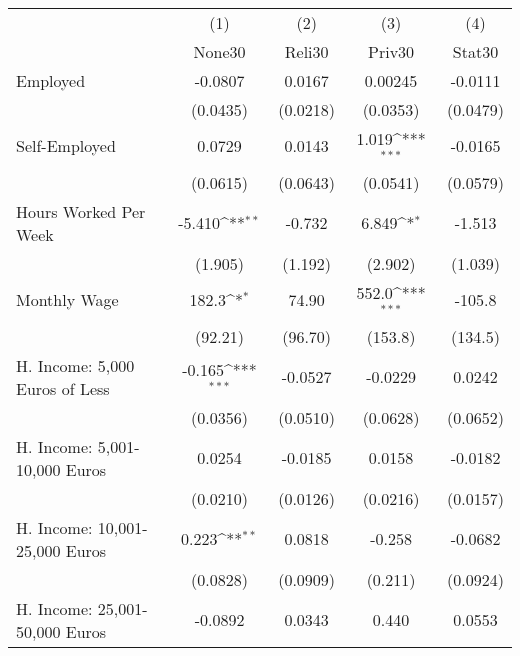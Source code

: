 {
\def\sym#1{\ifmmode^{#1}\else\(^{#1}\)\fi}
\begin{tabular}{l*{4}{c}}
\hline\hline
            &\multicolumn{1}{c}{(1)}&\multicolumn{1}{c}{(2)}&\multicolumn{1}{c}{(3)}&\multicolumn{1}{c}{(4)}\\
            &\multicolumn{1}{c}{None30}&\multicolumn{1}{c}{Reli30}&\multicolumn{1}{c}{Priv30}&\multicolumn{1}{c}{Stat30}\\
\hline
Employed    &     -0.0807         &      0.0167         &     0.00245         &     -0.0111         \\
            &    (0.0435)         &    (0.0218)         &    (0.0353)         &    (0.0479)         \\
[1em]
Self-Employed&      0.0729         &      0.0143         &       1.019\sym{***}&     -0.0165         \\
            &    (0.0615)         &    (0.0643)         &    (0.0541)         &    (0.0579)         \\
[1em]
Hours Worked Per Week&      -5.410\sym{**} &      -0.732         &       6.849\sym{*}  &      -1.513         \\
            &     (1.905)         &     (1.192)         &     (2.902)         &     (1.039)         \\
[1em]
Monthly Wage&       182.3\sym{*}  &       74.90         &       552.0\sym{***}&      -105.8         \\
            &     (92.21)         &     (96.70)         &     (153.8)         &     (134.5)         \\
[1em]
H. Income: 5,000 Euros of Less&      -0.165\sym{***}&     -0.0527         &     -0.0229         &      0.0242         \\
            &    (0.0356)         &    (0.0510)         &    (0.0628)         &    (0.0652)         \\
[1em]
H. Income: 5,001-10,000 Euros&      0.0254         &     -0.0185         &      0.0158         &     -0.0182         \\
            &    (0.0210)         &    (0.0126)         &    (0.0216)         &    (0.0157)         \\
[1em]
H. Income: 10,001-25,000 Euros&       0.223\sym{**} &      0.0818         &      -0.258         &     -0.0682         \\
            &    (0.0828)         &    (0.0909)         &     (0.211)         &    (0.0924)         \\
[1em]
H. Income: 25,001-50,000 Euros&     -0.0892         &      0.0343         &       0.440         &      0.0553         \\

\end{tabular}}
